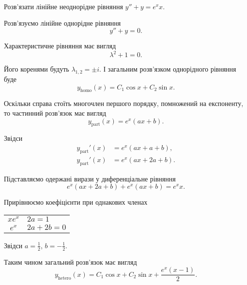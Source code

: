 \begin{example}
	Розв'язати лінійне неоднорідне рівняння $y'' + y = e^x x$.
\end{example}

\begin{solution}
	Розв'язуємо лінійне однорідне рівняння
	\begin{equation*}
		y'' + y = 0.
	\end{equation*}
	
	Характеристичне рівняння має вигляд
	\begin{equation*}
		\lambda^2 + 1 = 0.
	\end{equation*}

	Його коренями будуть $\lambda_{1, 2} = \pm i$. І загальним роз\-в'яз\-ком однорідного рівняння буде
	\begin{equation*}
		y_{\text{homo}}(x) = C_1 \cos x + C_2 \sin x.
	\end{equation*}

	Оскільки справа стоїть многочлен першого порядку, помножений на експоненту, то частинний роз\-в'яз\-ок має вигляд
	\begin{equation*}
		y_{\text{part}}(x) = e^x (a x + b).
	\end{equation*}

	Звідси
	\begin{align*}
		y_{\text{part}}'(x) &= e^x (a x + a + b), \\
		y_{\text{part}}'(x) &= e^x (a x + 2 a + b).
	\end{align*}

	Підставляємо одержані вирази у диференціальне рівняння
	\begin{equation*}
		e^x (a x + 2 a + b) + e^x (a x + b) = e^x x.
	\end{equation*}

	Прирівнюємо коефіцієнти при однакових членах
	\begin{table}[H]
		\centering
		\begin{tabular}{c|l}
			$x e^x$ & $2 a = 1$ \\
			$e^x$ & $2 a + 2 b = 0$
		\end{tabular}
	\end{table}

	Звідси $a = \frac12$, $b = - \frac12$. \parvskip

	Таким чином загальний розв'язок має вигляд
	\begin{equation*}
		y_{\text{hetero}}(x) = C_1 \cos x + C_2 \sin x + \frac{e^x (x - 1)}{2}.
	\end{equation*}
\end{solution}

